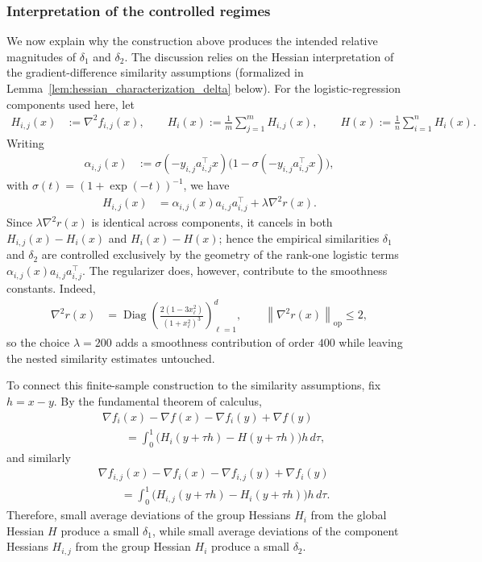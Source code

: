\documentclass{article}
\newcommand{\op}{\operatorname{op}}
\newcommand{\opnorm}[1]{\left\| #1 \right\|_{\op}}      %
\newcommand{\eqdef}{:=}
\DeclareMathOperator{\Diag}{Diag}       %
\newcommand{\rb}[1]{\left(#1\right)}
\theoremstyle{plain}
\begin{document}

\subsubsection{Interpretation of the controlled regimes}
\label{subsubsec:synthetic-regime-interpretation}

We now explain why the construction above produces the intended relative magnitudes of $\delta_1$ and $\delta_2$. The discussion relies on the Hessian interpretation of the gradient-difference similarity assumptions (formalized in Lemma~\ref{lem:hessian_characterization_delta} below). For the logistic-regression components used here, let
\begin{align*}
    H_{i,j}(x) &\eqdef \nabla^2 f_{i,j}(x), \qquad
    H_i(x) \eqdef \frac1m\sum_{j=1}^m H_{i,j}(x), \qquad
    H(x) \eqdef \frac1n\sum_{i=1}^n H_i(x).
\end{align*}
Writing
\begin{align*}
    \alpha_{i,j}(x)
    &\eqdef
    \sigma(-y_{i,j}a_{i,j}^{\top}x)
    \bigl(1-\sigma(-y_{i,j}a_{i,j}^{\top}x)\bigr),
\end{align*}
with $\sigma(t)=(1+\exp(-t))^{-1}$, we have
\begin{align*}
    H_{i,j}(x)
    &=
    \alpha_{i,j}(x)a_{i,j}a_{i,j}^{\top}
    +
    \lambda \nabla^2 r(x).
\end{align*}
Since $\lambda\nabla^2 r(x)$ is identical across components, it cancels in both $H_{i,j}(x)-H_i(x)$ and $H_i(x)-H(x)$; hence the empirical similarities $\delta_1$ and $\delta_2$ are controlled exclusively by the geometry of the rank-one logistic terms $\alpha_{i,j}(x)a_{i,j}a_{i,j}^{\top}$. The regularizer does, however, contribute to the smoothness constants. Indeed,
\begin{align*}
    \nabla^2 r(x)
    &=
    \Diag\!\rb{
    \frac{2(1-3x_\ell^2)}{(1+x_\ell^2)^3}
    }_{\ell=1}^d,
    \qquad
    \opnorm{\nabla^2 r(x)}\le 2,
\end{align*}
so the choice $\lambda=200$ adds a smoothness contribution of order $400$ while leaving the nested similarity estimates untouched.

To connect this finite-sample construction to the similarity assumptions, fix $h=x-y$. By the fundamental theorem of calculus,
\begin{align*}
    &\nabla f_i(x)-\nabla f(x)-\nabla f_i(y)+\nabla f(y) \\
    &\qquad =
    \int_0^1
    \bigl(H_i(y+\tau h)-H(y+\tau h)\bigr)h
    \,d\tau,
\end{align*}
and similarly
\begin{align*}
    &\nabla f_{i,j}(x)-\nabla f_i(x)-\nabla f_{i,j}(y)+\nabla f_i(y) \\
    &\qquad =
    \int_0^1
    \bigl(H_{i,j}(y+\tau h)-H_i(y+\tau h)\bigr)h
    \,d\tau.
\end{align*}
Therefore, small average deviations of the group Hessians $H_i$ from the global Hessian $H$ produce a small $\delta_1$, while small average deviations of the component Hessians $H_{i,j}$ from the group Hessian $H_i$ produce a small $\delta_2$.
\end{document}
